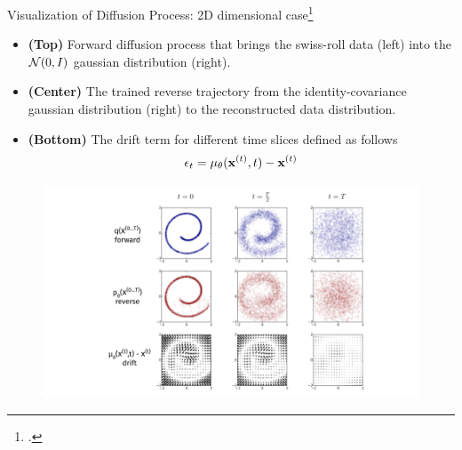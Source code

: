\documentclass[aspectratio=169, 9pt]{beamer}
\theoremstyle{definition}
\begin{document}
\begin{frame}{Visualization of Diffusion Process: 2D dimensional case\footcite{thermodynamic}}
  \begin{minipage}[h]{0.5\textwidth}
    \begin{itemize}
      \item \textbf{(Top)} Forward diffusion process that brings the
        swiss-roll data (left) into the $\mathcal{N}(0,I)$ gaussian
          distribution (right).
        \item \textbf{(Center)} The trained reverse trajectory from the
          identity-covariance gaussian distribution (right) to the
          reconstructed data distribution.
        \item \textbf{(Bottom)} The drift term for different time slices defined as follows
          \[
            \epsilon_t =\mu_\theta(\mathbf{x}^{(t)},t) - \mathbf{x}^{(t)}
          \]
    \end{itemize}
  \end{minipage}\hfill
  \begin{minipage}{0.5\textwidth}
    \begin{figure}[h]
      \centering
      \includegraphics[width=1.25\textwidth]{./pic/summary-forw-reverse.png}
    \end{figure}
  \end{minipage}
\end{frame}
\end{document}
